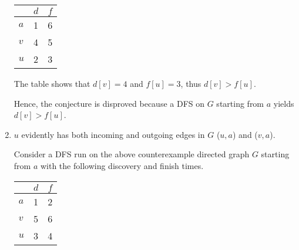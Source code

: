 \documentclass[a4paper]{report}
\begin{document}
\begin{enumerate}
      \begin{center}
        \begin{tabular}{ l | c | r }
          \hline
            & $d$ & $f$ \\ \hline
          $a$ & 1 & 6 \\
          $v$ & 4 & 5 \\
          $u$ & 2 & 3 \\
          \hline  
        \end{tabular}
      \end{center}

      The table shows that $d[v]=4$ and $f[u]=3$, thus $d[v] > f[u]$.

      Hence, the conjecture is disproved because a DFS on $G$ starting from $a$ yields $d[v] > f[u]$.


    \par
    \bigskip

    \item

      $u$ evidently has both incoming and outgoing edges in $G$ ($u,a$) and ($v,a$).

      Consider a DFS run on the above counterexample directed graph $G$ starting from $a$ with the 
      following discovery and finish times.  

      \begin{center}
        \begin{tabular}{ l | c | r }
          \hline
            & $d$ & $f$ \\ \hline
          $a$ & 1 & 2 \\
          $v$ & 5 & 6 \\
          $u$ & 3 & 4 \\
          \hline  
        \end{tabular}
      \end{center}



\end{enumerate}
\end{document}
